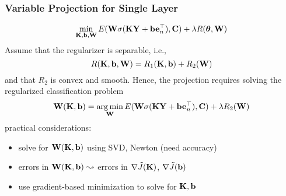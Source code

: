 \documentclass[12pt,fleqn,handout]{beamer}
\begin{document}
\begin{frame}
	\frametitle{Variable Projection for Single Layer}
	
$$
\min_{{\bf K},{\bf b},{\bf W}} E({\bf W} \sigma({\bf K}{\bf Y} +{\bf b} {\bf e}_n^\top ), {\bf C}) + \lambda R({\boldsymbol \theta},{\bf W})
$$
Assume that the regularizer is separable, i.e.,
$$
 R({\bf K},{\bf b},{\bf W}) =   R_1({\bf K},{\bf b}) +  R_2({\bf W})
$$
and that $R_2$ is convex and smooth. 
\pause
Hence, the projection requires solving the regularized classification problem
$$
{\bf W}({\bf K},{\bf b}) = \operatorname*{arg\,min}_{{\bf W}} E({\bf W}\sigma({\bf K}{\bf Y} + {\bf b} {\bf e}_n^\top), {\bf C}) + \lambda R_2({\bf W})
$$
practical considerations:
\begin{itemize}
	\item solve for ${\bf W}({\bf K},{\bf b})$ using SVD, Newton (need accuracy)
	\item errors in ${\bf W}({\bf K},{\bf b}) \leadsto$ errors in $\nabla \tilde{J}({\bf K})$, $\nabla \tilde{J}({\bf b})$
	\item use gradient-based minimization to solve for ${\bf K},{\bf b}$ 
\end{itemize}
\end{frame}
\end{document}
